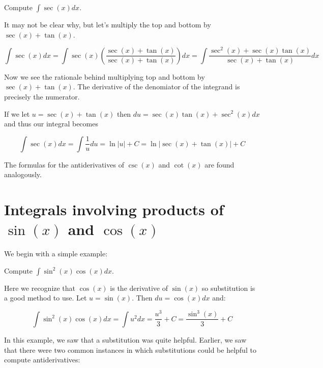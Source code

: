 \documentclass{ximera}
\begin{document}
\begin{example}
Compute $\int \sec(x) dx$.

\begin{explanation}
It may not be clear why, but let's multiply the top and bottom by $\sec(x) + \tan(x)$. 

\[
\int \sec(x) dx= \int \sec(x) \left( \frac{ \sec(x) + \tan(x)}{\sec(x)+\tan(x)} \right) dx = \int \frac{ \sec^{2}(x) + \sec(x)\tan(x)}{\sec(x)+\tan(x)} dx
\]

Now we see the rationale behind multiplying top and bottom by $\sec(x) + \tan(x)$. The derivative of the denomiator of the integrand is precisely the numerator. 

If we let $u=\sec(x)+\tan(x)$ then $du=\sec(x)\tan(x)+\sec^{2}(x) dx$ and thus our integral becomes

\[
\int \sec(x) dx = \int \frac{1}{u} du=\ln|u|+C=\ln|\sec(x)+\tan(x)|+C
\]

\end{explanation}

\end{example}


The formulas for the antiderivatives of $\csc(x)$ and $\cot(x)$ are found analogously.

\section{Integrals involving products of $\sin(x)$ and $\cos(x)$}

We begin with a simple example:

\begin{example}
Compute $\int \sin^{2}(x) \cos(x) dx$.

\begin{explanation}
Here we recognize that $\cos(x)$ is the derivative of $\sin(x)$ so substitution is a good method to use. Let $u=\sin(x)$. Then $du=\cos(x) dx$ and: 

\[ 
\int \sin^{2}(x) \cos(x) dx = \int u^{2} dx=\frac{u^{3}}{3}+C=\frac{ \sin^{3}(x)}{3}+C
\]
\end{explanation}

\end{example}

In this example, we saw that a substitution was quite helpful.  Earlier, we saw that there were two common instances in which substitutions could be helpful to compute antiderivatives:
\end{document}
